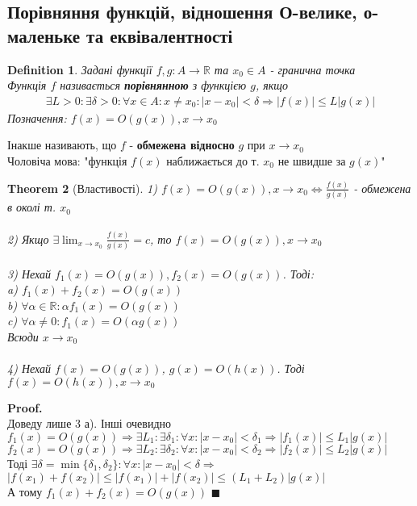 \documentclass[a4paper, 14pt]{extarticle}
\def\huge{\displaystyle}
\theoremstyle{theoremdd}
\newtheorem{theorem}{Theorem}[subsection]
\theoremstyle{theoremdd}
\newtheorem{definition}[theorem]{Definition}
\theoremstyle{theoremdd}
\theoremstyle{theoremdd}
\theoremstyle{theoremdd}
\theoremstyle{theoremdd}
\theoremstyle{theoremdd}
\theoremstyle{theoremdd}
\newenvironment{pf}{\vspace*{-3mm} \textbf{Proof. \\}}{$\blacksquare$}
\begin{document}
\subsection{Порівняння функцій, відношення О-велике, о-маленьке та еквівалентності}
\begin{definition}
Задані функції $f,g: A \to \mathbb{R}$ та $x_0 \in A$ - гранична точка\\
Функція $f$ називається \textbf{порівнянною} з функцією $g$, якщо
\begin{align*}
\exists L>0: \exists \delta > 0: \forall x \in A: x \neq x_0: |x-x_0| < \delta \Rightarrow |f(x)| \leq L |g(x)|
\end{align*}
Позначення: $f(x) = O(g(x)), x \to x_0$
\end{definition}
Інакше називають, що $f$ - \textbf{обмежена відносно} $g$ при $x \to x_0$\\
Чоловіча мова: "функція $f(x)$ наближається до т. $x_0$ не швидше за $g(x)$"
\begin{theorem}[Властивості]
1) $f(x) = O(g(x)), x \to x_0 \iff \huge \frac{f(x)}{g(x)}$ - обмежена в околі т. $x_0$\\
\\
2) Якщо $\exists \huge \lim_{x \to x_0} \frac{f(x)}{g(x)} = c$, то $f(x) = O(g(x)), x \to x_0$\\
\\
3) Нехай $f_1(x) = O(g(x)), f_2(x) = O(g(x))$. Тоді:\\
a) $f_1(x) + f_2(x) = O(g(x))$\\
b) $\forall \alpha \in \mathbb{R}: \alpha f_1(x) = O(g(x))$\\
c) $\forall \alpha \neq 0: f_1(x) = O(\alpha g(x))$\\
Всюди $x \to x_0$\\
\\
4) Нехай $f(x) = O(g(x))$, $g(x) = O(h(x))$. Тоді $f(x) = O(h(x)), x \to x_0$
\end{theorem}

\begin{pf}
Доведу лише 3 а). Інші очевидно\\
$f_1(x) = O(g(x)) \Rightarrow \exists L_1: \exists \delta_1: \forall x : |x-x_0| < \delta_1 \Rightarrow |f_1(x)| \leq L_1 |g(x)|$
$f_2(x) = O(g(x)) \Rightarrow \exists L_2: \exists \delta_2: \forall x : |x-x_0| < \delta_2 \Rightarrow |f_2(x)| \leq L_2 |g(x)|$\\
Тоді $\exists \delta = \min\{\delta_1, \delta_2 \}: \forall x: |x-x_0|<\delta \Rightarrow$\\
$|f(x_1)+f(x_2)| \leq |f(x_1)|+|f(x_2)| \leq (L_1+L_2)|g(x)|$\\
А тому $f_1(x) + f_2(x) = O(g(x))$
\end{pf}
\end{document}
